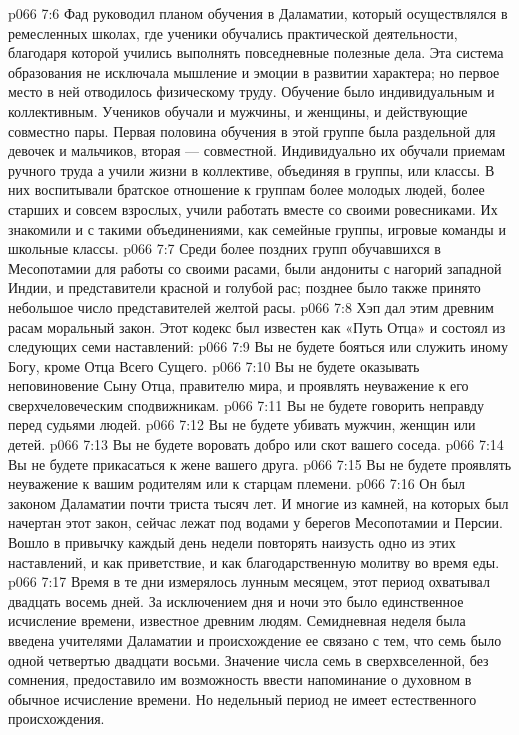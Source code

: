 \vs p066 7:6 \pc Фад руководил планом обучения в Даламатии, который осуществлялся в ремесленных школах, где ученики обучались практической деятельности, благодаря которой учились выполнять повседневные полезные дела. Эта система образования не исключала мышление и эмоции в развитии характера; но первое место в ней отводилось физическому труду. Обучение было индивидуальным и коллективным. Учеников обучали и мужчины, и женщины, и действующие совместно пары. Первая половина обучения в этой группе была раздельной для девочек и мальчиков, вторая --- совместной. Индивидуально их обучали приемам ручного труда а учили жизни в коллективе, объединяя в группы, или классы. В них воспитывали братское отношение к группам более молодых людей, более старших и совсем взрослых, учили работать вместе со своими ровесниками. Их знакомили и с такими объединениями, как семейные группы, игровые команды и школьные классы.
\vs p066 7:7 Среди более поздних групп обучавшихся в Месопотамии для работы со своими расами, были андониты с нагорий западной Индии, и представители красной и голубой рас; позднее было также принято небольшое число представителей желтой расы.
\vs p066 7:8 \pc Хэп дал этим древним расам моральный закон. Этот кодекс был известен как «Путь Отца» и состоял из следующих семи наставлений:
\vs p066 7:9 \bibnobreakspace Вы не будете бояться или служить иному Богу, кроме Отца Всего Сущего.
\vs p066 7:10 \bibnobreakspace Вы не будете оказывать неповиновение Сыну Отца, правителю мира, и проявлять неуважение к его сверхчеловеческим сподвижникам.
\vs p066 7:11 \bibnobreakspace Вы не будете говорить неправду перед судьями людей.
\vs p066 7:12 \bibnobreakspace Вы не будете убивать мужчин, женщин или детей.
\vs p066 7:13 \bibnobreakspace Вы не будете воровать добро или скот вашего соседа.
\vs p066 7:14 \bibnobreakspace Вы не будете прикасаться к жене вашего друга.
\vs p066 7:15 \bibnobreakspace Вы не будете проявлять неуважение к вашим родителям или к старцам племени.
\vs p066 7:16 \pc Он был законом Даламатии почти триста тысяч лет. И многие из камней, на которых был начертан этот закон, сейчас лежат под водами у берегов Месопотамии и Персии. Вошло в привычку каждый день недели повторять наизусть одно из этих наставлений, и как приветствие, и как благодарственную молитву во время еды.
\vs p066 7:17 \pc Время в те дни измерялось лунным месяцем, этот период охватывал двадцать восемь дней. За исключением дня и ночи это было единственное исчисление времени, известное древним людям. Семидневная неделя была введена учителями Даламатии и происхождение ее связано с тем, что семь было одной четвертью двадцати восьми. Значение числа семь в сверхвселенной, без сомнения, предоставило им возможность ввести напоминание о духовном в обычное исчисление времени. Но недельный период не имеет естественного происхождения.
